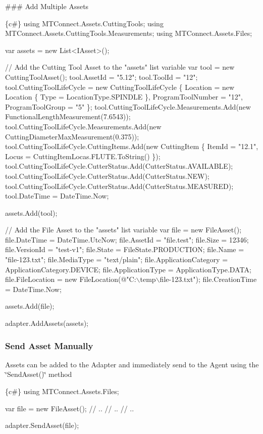 \#\#\# Add Multiple Assets 
\begin{DoxyCode}
\{c#\}
using MTConnect.Assets.CuttingTools;
using MTConnect.Assets.CuttingTools.Measurements;
using MTConnect.Assets.Files;

var assets = new List<IAsset>();


// Add the Cutting Tool Asset to the "assets" list variable
var tool = new CuttingToolAsset();
tool.AssetId = "5.12";
tool.ToolId = "12";
tool.CuttingToolLifeCycle = new CuttingToolLifeCycle
\{
    Location = new Location \{ Type = LocationType.SPINDLE \},
    ProgramToolNumber = "12",
    ProgramToolGroup = "5"
\};
tool.CuttingToolLifeCycle.Measurements.Add(new FunctionalLengthMeasurement(7.6543));
tool.CuttingToolLifeCycle.Measurements.Add(new CuttingDiameterMaxMeasurement(0.375));
tool.CuttingToolLifeCycle.CuttingItems.Add(new CuttingItem
\{
    ItemId = "12.1",
    Locus = CuttingItemLocas.FLUTE.ToString()
\});
tool.CuttingToolLifeCycle.CutterStatus.Add(CutterStatus.AVAILABLE);
tool.CuttingToolLifeCycle.CutterStatus.Add(CutterStatus.NEW);
tool.CuttingToolLifeCycle.CutterStatus.Add(CutterStatus.MEASURED);
tool.DateTime = DateTime.Now;

assets.Add(tool);


// Add the File Asset to the "assets" list variable
var file = new FileAsset();
file.DateTime = DateTime.UtcNow;
file.AssetId = "file.test";
file.Size = 12346;
file.VersionId = "test-v1";
file.State = FileState.PRODUCTION;
file.Name = "file-123.txt";
file.MediaType = "text/plain";
file.ApplicationCategory = ApplicationCategory.DEVICE;
file.ApplicationType = ApplicationType.DATA;
file.FileLocation = new FileLocation(@"C:\(\backslash\)temp\(\backslash\)file-123.txt");
file.CreationTime = DateTime.Now;

assets.Add(file);

adapter.AddAssets(assets);
\end{DoxyCode}


\subsubsection*{Send Asset Manually}

Assets can be added to the Adapter and immediately send to the Agent using the \char`\"{}\+Send\+Asset()\char`\"{} method 
\begin{DoxyCode}
\{c#\}
using MTConnect.Assets.Files;

var file = new FileAsset();
// ..
// ..
// ..

adapter.SendAsset(file);
\end{DoxyCode}


